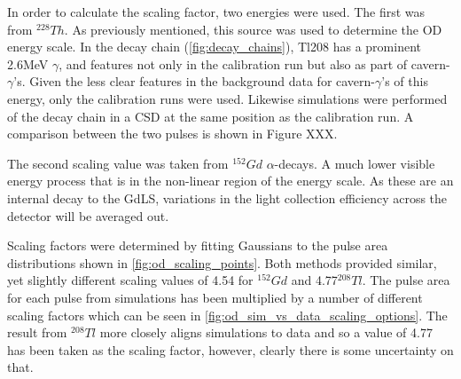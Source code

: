 \par
In order to calculate the scaling factor, two energies were used.
The first was from ${}^{228}Th$.
As previously mentioned, this source was used to determine the OD energy scale.
In the decay chain (\autoref{fig:decay_chains}), Tl208 has a prominent 2.6MeV $\gamma$, and features not only in the calibration run but also as part of cavern-$\gamma$'s.
Given the less clear features in the background data for cavern-$\gamma$'s of this energy, only the calibration runs were used.
Likewise simulations were performed of the decay chain in a CSD at the same position as the calibration run.
A comparison between the two pulses is shown in Figure XXX.
\par
The second scaling value was taken from ${}^{152}Gd$ $\alpha$-decays.
A much lower visible energy process that is in the non-linear region of the energy scale.
As these are an internal decay to the GdLS, variations in the light collection efficiency across the detector will be averaged out.
\par
Scaling factors were determined by fitting Gaussians to the pulse area distributions shown in \autoref{fig:od_scaling_points}.
Both methods provided similar, yet slightly different scaling values of 4.54 for ${}^{152}Gd$ and 4.77${}^{208}Tl$.
The pulse area for each pulse from simulations has been multiplied by a number of different scaling factors which can be seen in \autoref{fig:od_sim_vs_data_scaling_options}.
The result from ${}^{208}Tl$ more closely aligns simulations to data and so a value of 4.77 has been taken as the scaling factor, however, clearly there is some uncertainty on that.







